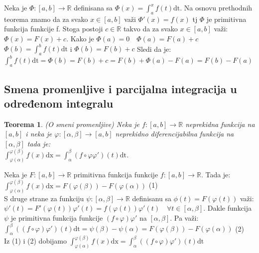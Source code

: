 \documentclass{article}
\newtheorem{teorema}{Teorema}[section]
\begin{document}
Neka je $\Phi: [a, b] \longrightarrow \mathbb{R}$ definisana sa $\Phi(x) = \displaystyle\int^x_a f(t)\text{dt}$. Na osnovu prethodnih teorema znamo da za svako $x\in [a, b]$ važi $\Phi'(x) = f(x)$ tj $\Phi$ je primitivna funkcija funkcije f. Stoga postoji $c \in \mathbb{R}$ takvo da za svako $x \in [a, b]$ važi:\\
$\Phi(x) = F(x) + c$. Kako je $\Phi(a) = 0\quad \Phi(a) = F(a) +c$\\
$\Phi(b) = \displaystyle\int^b_a f(t)\text{dt}$ i $\Phi(b) = F(b) + c$ Sledi da je:\\
$\displaystyle\int^b_a f(t)\text{dt} = \Phi(b) = F(b) + c = F(b) + \Phi(a) - F(a) = F(b) - F(a)$
\subsection{Smena promenljive i parcijalna integracija u određenom integralu}
\begin{teoremabox}
    \begin{teorema}
        (O smeni promenljive) Neka je $f:[a, b]\longrightarrow \mathbb{R}$ neprekidna funkcija na $[a,b]$ i neka je $\varphi: [\alpha, \beta] \longrightarrow [a, b]$ neprekidno diferencijabilna funkcija na $[\alpha, \beta]$ tada je:\\
        $\displaystyle \int^{\varphi(\beta)}_{\varphi(\alpha)} f(x)\text{dx} = \int^\beta_\alpha (f\circ\varphi\varphi')(t)\text{dt}$.
    \end{teorema}
\end{teoremabox}
Neka je $F:[a,b]\longrightarrow \mathbb{R}$ primitivna funkcija funkcije $f:[a,b]\longrightarrow\mathbb{R}$. Tada je:\\
$\displaystyle\int^{\varphi(\beta)}_{\varphi(\alpha)}f(x)\text{dx} = F(\varphi(\beta))-F(\varphi(\alpha))$ (1)\\
S druge strane za funkciju $\psi:[\alpha,\beta]\longrightarrow\mathbb{R}$ definisanu sa $\phi(t) = F(\varphi(t))$ važi: \\
$\psi'(t) = F'(\varphi(t))\varphi'(t) = f(\varphi(t))\varphi'(t)\quad\forall t\in[\alpha, \beta]$. Dakle funkcija $\psi$ je primitivna funkcija funkcije $(f\circ\varphi)\varphi'$ na $[\alpha,\beta]$. Pa važi:\\
$\displaystyle\int^\beta_\alpha ((f\circ\varphi)\varphi')(t)\text{dt} = \psi(\beta) - \psi(\alpha) = F(\varphi(\beta)) - F(\varphi(\alpha))$ (2)\\
Iz (1) i (2) dobijamo $\displaystyle\int^{\varphi(\beta)}_{\varphi(\alpha)} f(x)\text{dx} = \int^\beta_\alpha ((f\circ\varphi)\varphi')(t)\text{dt}$
\end{document}
